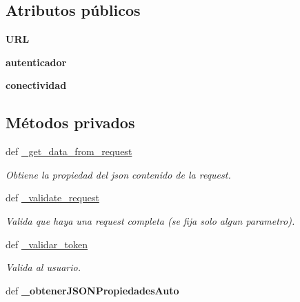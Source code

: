 \subsection*{Atributos públicos}
\begin{DoxyCompactItemize}
\item 
\hypertarget{classsrc_1_1resources_1_1agregar_auto_usuario_1_1_agregar_auto_usuario_a911f980f504a9f5959b0ab10b1c0c7d8}{{\bfseries U\-R\-L}}\label{classsrc_1_1resources_1_1agregar_auto_usuario_1_1_agregar_auto_usuario_a911f980f504a9f5959b0ab10b1c0c7d8}

\item 
\hypertarget{classsrc_1_1resources_1_1agregar_auto_usuario_1_1_agregar_auto_usuario_a815aacfb360ed387409ab7403e8bc8eb}{{\bfseries autenticador}}\label{classsrc_1_1resources_1_1agregar_auto_usuario_1_1_agregar_auto_usuario_a815aacfb360ed387409ab7403e8bc8eb}

\item 
\hypertarget{classsrc_1_1resources_1_1agregar_auto_usuario_1_1_agregar_auto_usuario_a6dc64a42aa7080532a97000c60350b68}{{\bfseries conectividad}}\label{classsrc_1_1resources_1_1agregar_auto_usuario_1_1_agregar_auto_usuario_a6dc64a42aa7080532a97000c60350b68}

\end{DoxyCompactItemize}
\subsection*{Métodos privados}
\begin{DoxyCompactItemize}
\item 
def \hyperlink{classsrc_1_1resources_1_1agregar_auto_usuario_1_1_agregar_auto_usuario_aef3d46a2434c1b8529ec3ff213d67b90}{\-\_\-get\-\_\-data\-\_\-from\-\_\-request}
\begin{DoxyCompactList}\small\item\em Obtiene la propiedad del json contenido de la request. \end{DoxyCompactList}\item 
def \hyperlink{classsrc_1_1resources_1_1agregar_auto_usuario_1_1_agregar_auto_usuario_ab5ea45024086cb5f15f0202f2289222c}{\-\_\-validate\-\_\-request}
\begin{DoxyCompactList}\small\item\em Valida que haya una request completa (se fija solo algun parametro). \end{DoxyCompactList}\item 
def \hyperlink{classsrc_1_1resources_1_1agregar_auto_usuario_1_1_agregar_auto_usuario_aac280b9aeeb811c61fb93540f253c7fa}{\-\_\-validar\-\_\-token}
\begin{DoxyCompactList}\small\item\em Valida al usuario. \end{DoxyCompactList}\item 
\hypertarget{classsrc_1_1resources_1_1agregar_auto_usuario_1_1_agregar_auto_usuario_a3d9a48144164751815316052e34bfdc0}{def {\bfseries \-\_\-obtener\-J\-S\-O\-N\-Propiedades\-Auto}}\label{classsrc_1_1resources_1_1agregar_auto_usuario_1_1_agregar_auto_usuario_a3d9a48144164751815316052e34bfdc0}

\end{DoxyCompactItemize}


